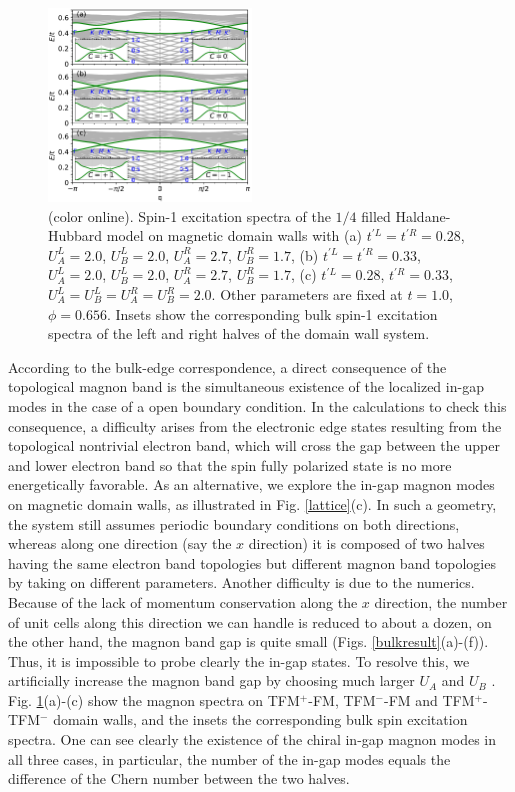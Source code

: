 \documentclass[amsmath,superscriptaddress,showpacs,aps,prl,twocolumn]{revtex4-1}
\begin{document}
\begin{figure}
\centering
\includegraphics[width=0.48\textwidth]{domainwallspectra}
\caption{(color online). Spin-1 excitation spectra of the $1/4$ filled Haldane-Hubbard model on magnetic domain walls with (a) $t^{\prime L}=t^{\prime R}=0.28$, $U^L_A=2.0$, $U^L_B=2.0$, $U^R_A=2.7$, $U^R_B=1.7$, (b) $t^{\prime L}=t^{\prime R}=0.33$, $U^L_A=2.0$, $U^L_B=2.0$, $U^R_A=2.7$, $U^R_B=1.7$, (c) $t^{\prime L}=0.28$, $t^{\prime R}=0.33$, $U^L_A=U^L_B=U^R_A=U^R_B=2.0$. Other parameters are fixed at $t=1.0$, $
\phi=0.656$. Insets show the corresponding bulk spin-1 excitation spectra of the left and right halves of the domain wall system.}
\label{domainwallspectra}
\end{figure}

\par According to the bulk-edge correspondence, a direct consequence of the topological magnon band is the simultaneous existence of the localized in-gap modes in the case of a open boundary condition. In the calculations to check this consequence, a difficulty arises from the electronic edge states resulting from the topological nontrivial electron band, which will cross the gap between the upper and lower electron band so that the spin fully polarized state is no more energetically favorable. As an alternative, we explore the in-gap magnon modes on magnetic domain walls, as illustrated in Fig. \ref{lattice}(c). In such a geometry, the system still assumes periodic boundary conditions on both directions, whereas along one direction (say the $x$ direction) it is composed of two halves having the same electron band topologies but different magnon band topologies by taking on different parameters. Another difficulty is due to the numerics. Because of the lack of momentum conservation along the $x$ direction, the number of unit cells along this direction we can handle is reduced to about a dozen, on the other hand, the magnon band gap is quite small (Figs. \ref{bulkresult}(a)-(f)). Thus, it is impossible to probe clearly the in-gap states. To resolve this, we artificially increase the magnon band gap by choosing much larger $U_A$ and $U_B$ \cite{gap}. Fig. \ref{domainwallspectra}(a)-(c) show the magnon spectra on TFM$^+$-FM, TFM$^-$-FM and TFM$^+$-TFM$^-$ domain walls, and the insets the corresponding bulk spin excitation spectra. One can see clearly the existence of the chiral in-gap magnon modes in all three cases, in particular, the number of the in-gap modes equals the difference of the Chern number between the two halves.
\end{document}
